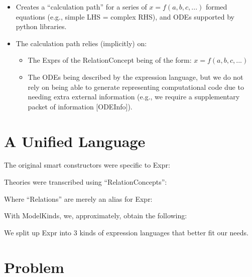 \begin{itemize}

	\item Creates a ``calculation path'' for a series of $x = f(a,b,c,...)$
	      formed equations (e.g., simple LHS = complex RHS), and ODEs
	      supported by python libraries.

	\item The calculation path relies (implicitly) on:
	      \begin{itemize}

		      \item The Exprs of the RelationConcept being of the form: $x =
			            f(a,b,c,...)$

		      \item The ODEs being described by the expression language, but
		            we do not rely on being able to generate representing
		            computational code due to needing extra external
		            information (e.g., we require a supplementary packet of
		            information [ODEInfo]).

	      \end{itemize}

\end{itemize}

\section{A Unified Language}
\label{sec:modelkinds:language}

\originalExprHaskell

The original smart constructors were specific to Expr:

\originalFewExprSmartConstructorsHaskell

Theories were transcribed using ``RelationConcepts'':

\originalRelationConcept

Where ``Relations'' are merely an alias for Expr:

\originalRelation{}

\theoriesWithoutModelKinds

With ModelKinds, we, approximately, obtain the following:

\theoriesWithModelKinds

We split up Expr into 3 kinds of expression languages that better fit our needs.

\section{Problem}

